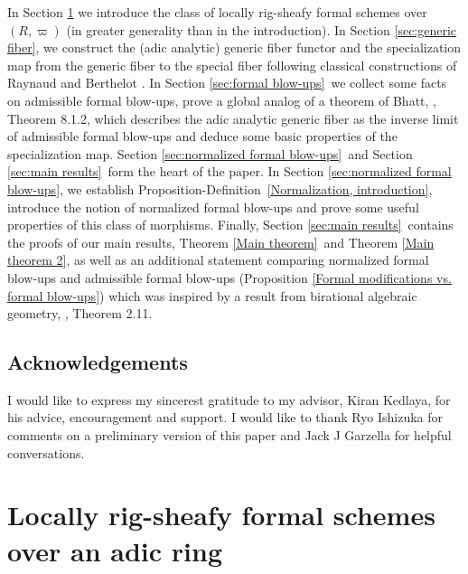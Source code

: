 \documentclass[12pt,twoside,a4paper]{article}
\theoremstyle{definition}
\theoremstyle{remark}
\begin{document}
In Section \ref{sec:formal schemes} we introduce the class of locally rig-sheafy formal schemes over $(R, \varpi)$ (in greater generality than in the introduction). In Section \ref{sec:generic fiber}, we construct the (adic analytic) generic fiber functor and the specialization map from the generic fiber to the special fiber following classical constructions of Raynaud \cite{RaynaudReport} and Berthelot \cite{Berthelot96}. In Section \ref{sec:formal blow-ups} we collect some facts on admissible formal blow-ups, prove a global analog of a theorem of Bhatt, \cite{BhattNotes}, Theorem 8.1.2, which describes the adic analytic generic fiber as the inverse limit of admissible formal blow-ups and deduce some basic properties of the specialization map. Section \ref{sec:normalized formal blow-ups} and Section \ref{sec:main results} form the heart of the paper. In Section \ref{sec:normalized formal blow-ups}, we establish Proposition-Definition~\ref{Normalization, introduction}, introduce the notion of normalized formal blow-ups and prove some useful properties of this class of morphisms. Finally, Section \ref{sec:main results} contains the proofs of our main results, Theorem \ref{Main theorem} and Theorem \ref{Main theorem 2}, as well as an additional statement comparing normalized formal blow-ups and admissible formal blow-ups (Proposition \ref{Formal modifications vs. formal blow-ups}) which was inspired by a result from birational algebraic geometry, \cite{Conrad07}, Theorem 2.11. 

\subsection{Acknowledgements}

I would like to express my sincerest gratitude to my advisor, Kiran Kedlaya, for his advice, encouragement and support. I would like to thank Ryo Ishizuka for comments on a preliminary version of this paper and Jack J Garzella for helpful conversations. 

\section{Locally rig-sheafy formal schemes over an adic ring}\label{sec:formal schemes}
\end{document}
